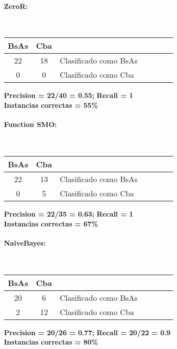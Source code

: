 \paragraph*{ZeroR:}\mbox{}\\
\begin{table}[H]
\centering
\begin{tabular}{|c|c|l|c|c|c|c|}
\hline
 BsAs & Cba &  \\ \hline
 22 &  18 &  Clasificado como BsAs \\ \hline
 0  &   0 &  Clasificado como Cba \\ \hline
\end{tabular}
\end{table}
\begin{center}
\textbf{Precision = 22/40 = 0.55;} \textbf{Recall = 1}\\
\textbf{Instancias correctas = 55\%}
\end{center}

\paragraph*{Function SMO:}\mbox{}\\
\begin{table}[H]
\centering
\begin{tabular}{|c|c|l|c|c|c|c|}
\hline
 BsAs & Cba &  \\ \hline
 22 &  13 &  Clasificado como BsAs \\ \hline
 0  &   5 &  Clasificado como Cba \\ \hline
\end{tabular}
\end{table}
\begin{center}
\textbf{Precision = 22/35 = 0.63;} \textbf{Recall = 1}\\
\textbf{Instancias correctas = 67\%}
\end{center}

\paragraph*{NaiveBayes:}\mbox{}\\
\begin{table}[H]
\centering
\begin{tabular}{|c|c|l|c|c|c|c|}
\hline
 BsAs & Cba &  \\ \hline
 20 &  6 &  Clasificado como BsAs \\ \hline
 2  &  12 &  Clasificado como Cba \\ \hline
\end{tabular}
\end{table}
\begin{center}
\textbf{Precision = 20/26 = 0.77;} \textbf{Recall = 20/22 = 0.9}\\
\textbf{Instancias correctas = 80\%}
\end{center}

